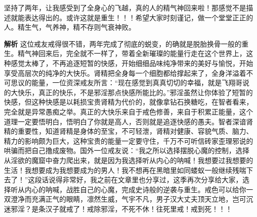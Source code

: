 \begin{case}
    坚持了两年，让我感受到了全身心的飞越，真的人的精气神回来啦！那感觉不是描述就能表达得出的。或许这就是重生！！！希望大家时刻谨记，做一个堂堂正正的人。精生气，气养神，精不存则气衰神败。

    \textbf{解析} 这位戒友戒得很不错，两年完成了彻底的蜕变，的确就是脱胎换骨一般的重生。精气神回来后，完全就不一样了，带着全新璀璨的能量行走在这个世界上，这种感觉太棒了，不再追逐短暂的快感，开始细细品味纯净带来的美好与愉悦，开始享受高层次的纯净的大快乐。肾精把全身每一个细胞都给撑起来了，全身洋溢着不可思议的能量，一位资深戒友所言：“现在感觉到真真切切的幸福，就是飞翔哥说的大快乐，真正的快乐，不是邪淫那点快感所能比的。”邪淫虽然让你体验了短暂的快感，但这种快感是以耗损宝贵肾精为代价的，就像拿钻石换糖吃，在智者看来，完全就是异常愚痴之举。真正的大快乐来自于戒色修善，来自于积累正能量，这个道理一定要悟明白，悟明白了你就是高人，否则就是追逐快感的愚夫。智者深谙肾精的重要性，知道肾精是身体的至宝，不可轻泄，肾精对健康、容貌气质、脑力、精力的影响颇为巨大，这种宝贵的能量一定要守住，千万不可听信砖家歪理邪说的哄骗而把自己撸成废物。国外一位戒友说：“我之所以选择摆脱心魔的控制，选择从淫欲的魔窟中奋力爬出来，就是因为我选择听从内心的呐喊！我想要过我想要的生活！我想要成为我想要成为的男人！我不想再在黑暗里如同蝼蚁一般继续残喘下去了！”这段话说得非常好，我之前在文章里也分享过，这季再次分享给大家，选择听从内心的呐喊，战胜自己的心魔，完成史诗般的逆袭与重生。戒色可以给你一双澄净而充满正气的眼睛，凛然生威，气宇不凡，男子汉大丈夫顶天立地，岂可沉迷邪淫？是条汉子就戒了！戒除邪淫，不死不休！往死里戒！戒到死！！！
\end{case}

